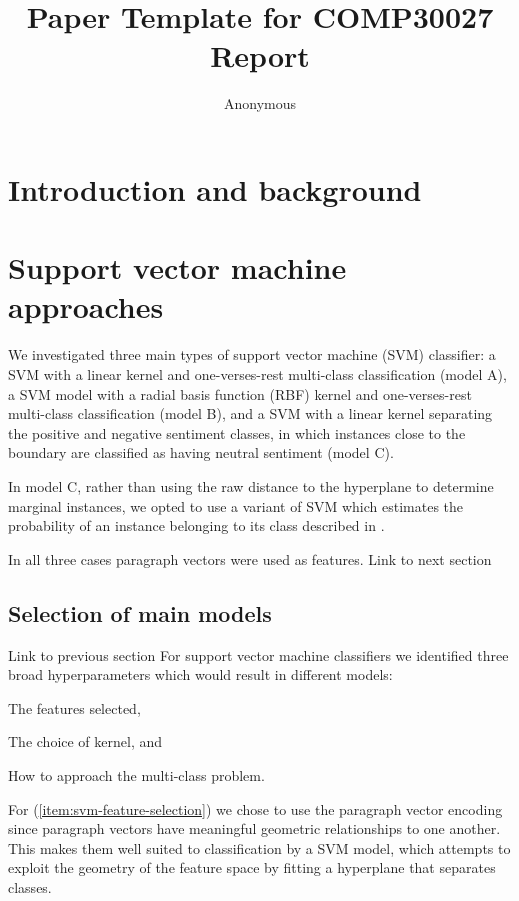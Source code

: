 \documentclass[11pt]{article}
\title{Paper Template for COMP30027 Report}
\author
{Anonymous}
\newcommand{\drafting}[1]{\textcolor{OliveGreen}{#1}}
\begin{document}
\maketitle

\section{Introduction and background}




\section{Support vector machine approaches}
We investigated three main types of support vector machine (SVM) classifier: a SVM with a linear kernel and one-verses-rest multi-class classification (model A), a SVM model with a radial basis function (RBF) kernel and one-verses-rest multi-class classification (model B), and a SVM with a linear kernel separating the positive and negative sentiment classes, in which instances close to the boundary are classified as having neutral sentiment (model C). 

In model C, rather than using the raw distance to the hyperplane to determine marginal instances, we opted to use a variant of SVM which estimates the probability of an instance belonging to its class described in \cite{platt_probabilistic_1999}. 

In all three cases paragraph vectors were used as features. \drafting{Link to next section}

\subsection{Selection of main models}
\drafting{Link to previous section}
For support vector machine classifiers we identified three broad hyperparameters which would result in different models: \begin{enumerate*}
	\item The features selected, \label{item:svm-feature-selection}
	\item The choice of kernel, and \label{item:svm-kernel}
	\item How to approach the multi-class problem. \label{item:svm-multiclass-v-binary}
\end{enumerate*}

For (\ref{item:svm-feature-selection}) we chose to use the paragraph vector encoding \cite{le_distributed_2014} since paragraph vectors have meaningful geometric relationships to one another. This makes them well suited to classification by a SVM model, which attempts to exploit the geometry of the feature space by fitting a hyperplane that separates classes. 
\end{document}
